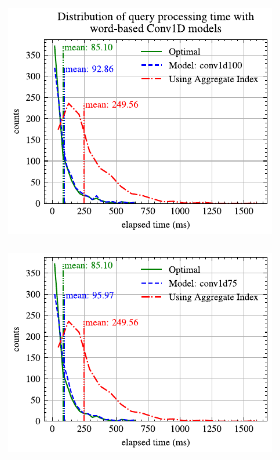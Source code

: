 \documentclass[conference]{IEEEtran}
\begin{document}
\begin{figure}[!h]
	\centering
	\begin{subfigure}{0.45\textwidth}
		\begin{subfigure}{\textwidth}
			\centering
			\includegraphics[]{graphics/perf_dist_conv1d100_A.pdf}
		\end{subfigure}
		\vfill
		\begin{subfigure}{\textwidth}
			\centering
			\includegraphics[]{graphics/perf_dist_conv1d75_A.pdf}
		\end{subfigure}
		\vfill
		\begin{subfigure}{\textwidth}
			\centering

\end{subfigure}
\end{subfigure}
\end{figure}
\end{document}
